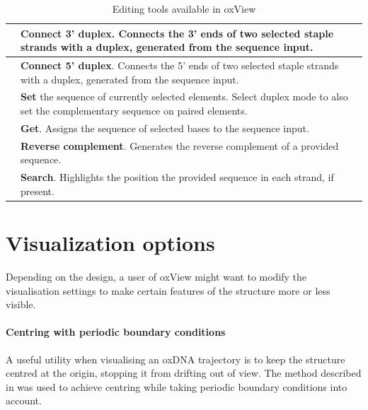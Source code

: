 \begin{table}[h]
\begin{tabularx}{\textwidth} { >{\centering\arraybackslash}m{3em} | X }
 & \textbf{Connect 3' duplex}. Connects the 3' ends of two selected staple strands with a duplex, generated from the sequence input. \\ \hline
 & \textbf{Connect 5' duplex}. Connects the 5' ends of two selected staple strands with a duplex, generated from the sequence input. \\ \hline
 & \textbf{Set} the sequence of currently selected elements. Select duplex mode to also set the complementary sequence on paired elements. \\ \hline
 & \textbf{Get}. Assigns the sequence of selected bases to the sequence input.  \\ \hline
 & \textbf{Reverse complement}. Generates the reverse complement of a provided sequence. \\ \hline
 & \textbf{Search}. Highlights the position the provided sequence in each strand, if present. \\ \hline
\end{tabularx}

\caption{Editing tools available in oxView}
\label{table:edit_tools}
\end{table}



\section{Visualization options}
Depending on the design, a user of oxView might want to modify the visualisation settings to make certain features of the structure more or less visible.

\paragraph{Centring with periodic boundary conditions} A useful utility when visualising an oxDNA trajectory is to keep the structure centred at the origin, stopping it from drifting out of view. The method described in \cite{PBC_centring} was used to achieve centring while taking periodic boundary conditions into account.


